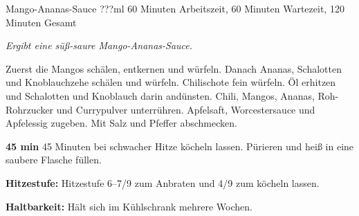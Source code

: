 \begin{recipe}{Mango-Ananas-Sauce} {???ml} {60 Minuten Arbeitszeit, 60 Minuten Wartezeit, 120 Minuten Gesamt}

  \freeform{}\textit{Ergibt eine süß-saure Mango-Ananas-Sauce.}


  Zuerst die Mangos schälen, entkernen und würfeln.
  Danach Ananas, Schalotten und Knoblauchzehe schälen und würfeln.
  Chilischote fein würfeln.
  Öl erhitzen und Schalotten und Knoblauch darin andünsten.
  Chili, Mangos, Ananas, Roh-Rohrzucker und Currypulver unterrühren.
  Apfelsaft, Worcestersauce und Apfelessig zugeben.
  Mit Salz und Pfeffer abschmecken.

  \newstep{}\textbf{45 min}
  45 Minuten bei schwacher Hitze köcheln lassen.
  Pürieren und heiß in eine saubere Flasche füllen.

  \freeform{}\hrulefill{}

  \freeform{}\textbf{Hitzestufe:}
  Hitzestufe 6–7/9 zum Anbraten und 4/9 zum köcheln lassen.

  \freeform{}\textbf{Haltbarkeit:}
  Hält sich im Kühlschrank mehrere Wochen.

\end{recipe}
